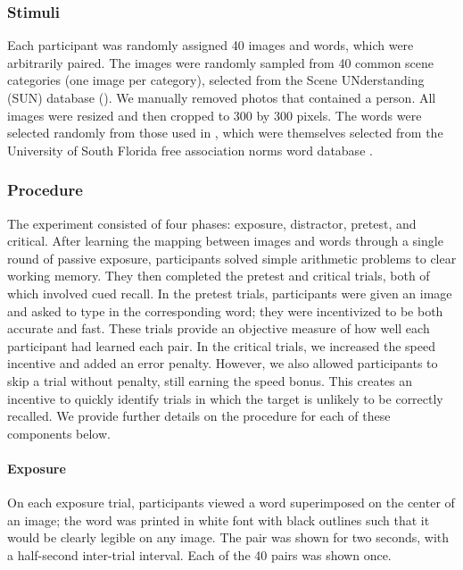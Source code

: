 \subsubsection{Stimuli}

Each participant was randomly assigned 40 images and words, which were arbitrarily paired. The images were randomly sampled from 40 common scene categories (one image per category), selected from the Scene UNderstanding (SUN) database (\citealt{5539970}). We manually removed photos that contained a person. All images were resized and then cropped to 300 by 300 pixels. The words were selected randomly from those used in \citet{madan2021exploring}, which were themselves selected from the University of South Florida free association norms word database \citep{nelson2004university}.

\subsubsection{Procedure}

The experiment consisted of four phases: exposure, distractor, pretest, and critical. After learning the mapping between images and words through a single round of passive exposure, participants solved simple arithmetic problems to clear working memory. They then completed the pretest and critical trials, both of which involved cued recall. In the pretest trials, participants were given an image and asked to type in the corresponding word; they were incentivized to be both accurate and fast. These trials provide an objective measure of how well each participant had learned each pair. In the critical trials, we increased the speed incentive and added an error penalty. However, we also allowed participants to skip a trial without penalty, still earning the speed bonus. This creates an incentive to quickly identify trials in which the target is unlikely to be correctly recalled. We provide further details on the procedure for each of these components below.

\paragraph{Exposure} On each exposure trial, participants viewed a word superimposed on the center of an image; the word was printed in white font with black outlines such that it would be clearly legible on any image. The pair was shown for two seconds, with a half-second inter-trial interval. Each of the 40 pairs was shown once.

